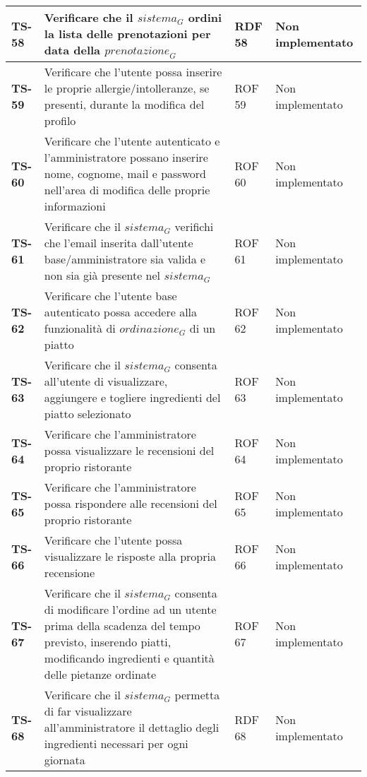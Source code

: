 \begin{longtable}{|>{\centering\arraybackslash}p{1.5cm}|p{9.8cm}|p{2cm}|p{3.5cm}|}
    \hline
    \rowcolor{gray!10}
    \textbf{TS-58} & Verificare che il $\textit{sistema}_G$ ordini la lista delle prenotazioni per data della $\textit{prenotazione}_G$ & RDF 58 & Non implementato \\ 
    \hline
    \rowcolor{gray!10}
    \textbf{TS-59} & Verificare che l'utente possa inserire le proprie allergie/intolleranze, se presenti, durante la modifica del profilo & ROF 59 & Non implementato \\ 
    \hline
    \rowcolor{gray!10}
    \textbf{TS-60} & Verificare che l'utente autenticato e l'amministratore possano inserire nome, cognome, mail e password nell'area di modifica delle proprie informazioni & ROF 60 & Non implementato \\ 
    \hline
    \rowcolor{gray!10}
    \textbf{TS-61} & Verificare che il $\textit{sistema}_G$ verifichi che l'email inserita dall'utente base/amministratore sia valida e non sia già presente nel $\textit{sistema}_G$ & ROF 61 & Non implementato \\ 
    \hline
    \rowcolor{gray!10}
    \textbf{TS-62} & Verificare che l'utente base autenticato possa accedere alla funzionalità di $\textit{ordinazione}_G$ di un piatto & ROF 62 & Non implementato \\
    \hline
    \rowcolor{gray!10}
    \textbf{TS-63} & Verificare che il $\textit{sistema}_G$ consenta all'utente di visualizzare, aggiungere e togliere ingredienti del piatto selezionato & ROF 63 & Non implementato \\
    \hline
    \rowcolor{gray!10}
    \textbf{TS-64} & Verificare che l'amministratore possa visualizzare le recensioni del proprio ristorante & ROF 64 & Non implementato \\ 
    \hline
    \rowcolor{gray!10}
    \textbf{TS-65} & Verificare che l'amministratore possa rispondere alle recensioni del proprio ristorante & ROF 65 & Non implementato \\ 
    \hline
    \rowcolor{gray!10}
    \textbf{TS-66} & Verificare che l'utente possa visualizzare le risposte alla propria recensione & ROF 66 & Non implementato \\
    \hline
    \rowcolor{gray!10}
    \textbf{TS-67} & Verificare che il $\textit{sistema}_G$ consenta di modificare l'ordine ad un utente prima della scadenza del tempo previsto, inserendo piatti, modificando ingredienti e quantità delle pietanze ordinate & ROF 67 & Non implementato \\ 
    \hline
    \rowcolor{gray!10}
    \textbf{TS-68} & Verificare che il $\textit{sistema}_G$ permetta di far visualizzare all'amministratore il dettaglio degli ingredienti necessari per ogni giornata & RDF 68 & Non implementato \\ 

\end{longtable}
